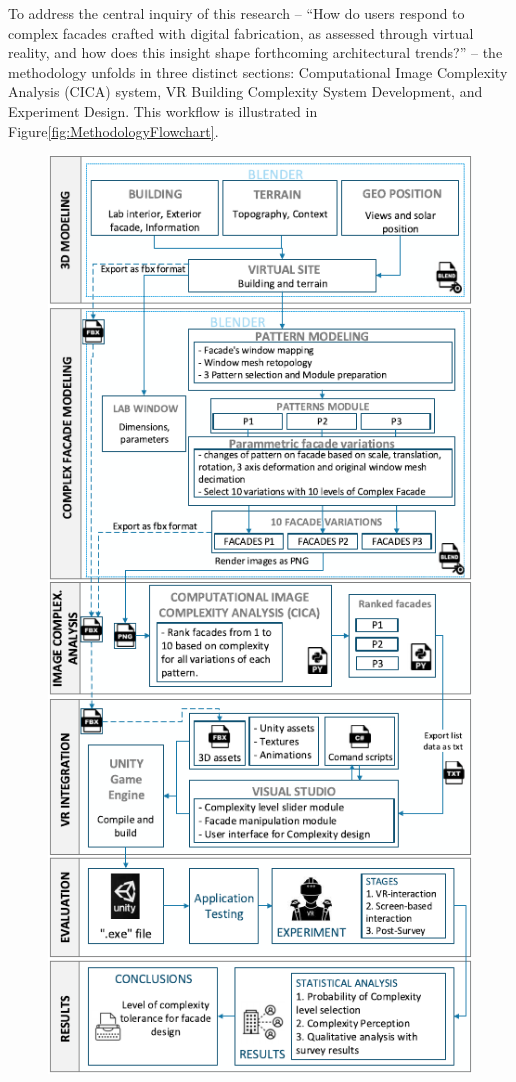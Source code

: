 
To address the central inquiry of this research – ``How do users respond to complex facades crafted with digital fabrication, as assessed through virtual reality, and how does this insight shape forthcoming architectural trends?'' – the methodology unfolds in three distinct sections: Computational Image Complexity Analysis (CICA) system, VR Building Complexity System Development, and Experiment Design.
This workflow is illustrated in Figure\ref{fig:MethodologyFlowchart}.

    \begin{figure}[!htb]
      \centering
      \includegraphics[width= \linewidth, trim=0 0 0 0, clip]{Images/MethodologyFlowchart}

\end{figure}
